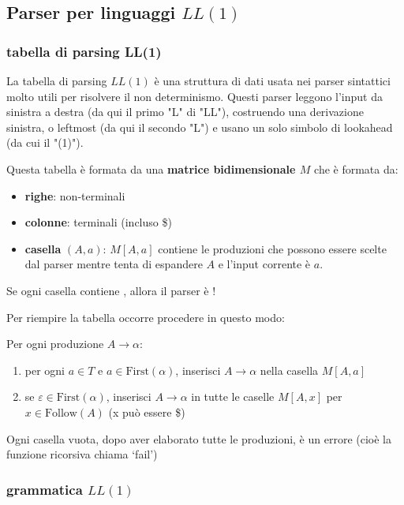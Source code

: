 \subsection{Parser per linguaggi $LL(1)$}
\subsubsection{tabella di parsing LL(1)}
La tabella di parsing $LL(1)$ è una struttura di dati usata nei parser sintattici molto utili per risolvere il non determinismo. Questi parser leggono l'input da sinistra a destra (da qui il primo "L" di "LL"), costruendo una derivazione sinistra, o leftmost (da qui il secondo "L") e usano un solo simbolo di lookahead (da cui il "(1)").

Questa tabella è formata da una \textbf{matrice bidimensionale $M$} che è formata da:
\begin{itemize}
    \item \textbf{righe}: non-terminali
    \item \textbf{colonne}: terminali (incluso \$)
    \item \textbf{casella} $(A, a)$: $M[A, a]$ contiene le produzioni che possono essere scelte dal parser mentre tenta di espandere $A$ e l'input corrente è $a$.
\end{itemize}

Se ogni casella contiene , allora il parser è !


Per riempire la tabella occorre procedere in questo modo:

Per ogni produzione $A \rightarrow \alpha$:
\begin{enumerate}
    \item per ogni $a \in T$ e $a \in \text{First}(\alpha)$, inserisci $A \rightarrow \alpha$ nella casella $M[A, a]$
    \item se $\varepsilon \in \text{First}(\alpha)$, inserisci $A \rightarrow \alpha$ in tutte le caselle $M[A, x]$ per $x \in \text{Follow}(A)$ (x può essere \$)
\end{enumerate}

Ogni casella vuota, dopo aver elaborato tutte le produzioni, è un errore (cioè la funzione ricorsiva chiama `fail')

\subsubsection{grammatica $LL(1)$}


